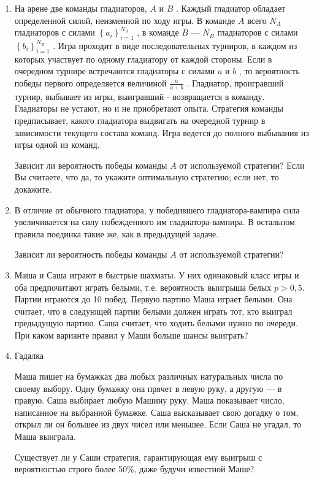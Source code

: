 \documentclass[12pt,a4paper]{article}
\begin{document}
\begin{enumerate}
\item На арене две команды гладиаторов,  $A$  и  $B$ . Каждый гладиатор обладает определенной силой, неизменной по ходу игры. В команде  $A$  всего  $N_{A} $  гладиаторов с силами  $\left\{a_{i} \right\}_{i=1}^{N_{A} } $ , в команде  $B$  ---  $N_{B} $  гладиаторов с силами  $\left\{b_{i} \right\}_{i=1}^{N_{B} } $ . Игра проходит в виде последовательных турниров, в каждом из которых участвует по одному гладиатору от каждой стороны. Если в очередном турнире встречаются гладиаторы с силами  $a$  и  $b$ , то вероятность победы первого определяется величиной  $\frac{a}{a+b} $ . Гладиатор, проигравший турнир, выбывает из игры, выигравший - возвращается в команду. Гладиаторы не устают, но и не приобретают опыта. Стратегия команды предписывает, какого гладиатора выдвигать на очередной турнир в зависимости текущего состава команд. Игра ведется до полного выбывания из игры одной из команд.

Зависит ли вероятность победы команды  $A$  от используемой стратегии? Если Вы считаете, что да, то укажите оптимальную стратегию; если нет, то докажите.

\item В отличие от обычного гладиатора, у победившего гладиатора-вампира сила увеличивается на силу побежденного им гладиатора-вампира. В остальном правила поединка такие же, как в предыдущей задаче.

Зависит ли вероятность победы команды  $A$  от используемой стратегии?

\item Маша и Саша играют в быстрые шахматы. У них одинаковый класс игры и оба предпочитают играть белыми, т.е. вероятность выигрыша белых  $p>0,5$. Партии играются до 10 побед. Первую партию Маша играет белыми. Она считает, что в следующей партии белыми должен играть тот, кто выиграл предыдущую партию. Саша считает, что ходить белыми нужно по очереди. При каком варианте правил у Маши больше шансы выиграть?

\item Гадалка

Маша пишет на бумажках два любых различных натуральных числа по своему выбору. Одну бумажку она прячет в левую руку, а другую --- в правую. Саша выбирает любую Машину руку. Маша показывает число, написанное на выбранной бумажке. Саша высказывает свою догадку о том, открыл ли он большее из двух чисел или меньшее. Если Саша не угадал, то Маша выиграла.

Существует ли у Саши стратегия, гарантирующая ему выигрыш с вероятностью строго более 50\%, даже будучи известной Маше?


\end{enumerate}
\end{document}
